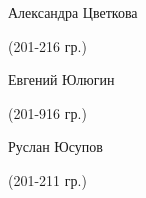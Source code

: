 \begin{multicols}{2}
\begin{small}
\begin{enumerate*}
	\item Александра Цветкова\begin{tiny} (201-216 гр.)\end{tiny}
	\item Евгений Юлюгин\begin{tiny} (201-916 гр.)\end{tiny}
	\item Руслан Юсупов\begin{tiny} (201-211 гр.)\end{tiny}
\end{enumerate*}
\end{small}
\end{multicols}